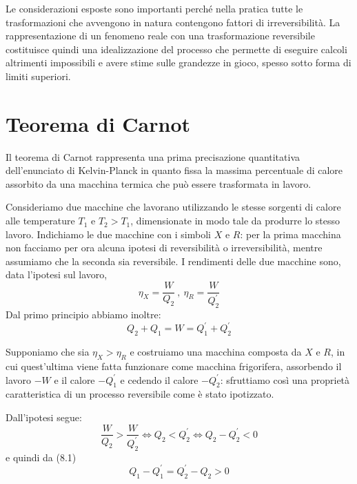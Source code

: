 \documentclass[class=book, crop=false, oneside, 12pt]{standalone}
\begin{document}
Le considerazioni esposte sono importanti perché nella pratica tutte le trasformazioni che avvengono in natura contengono fattori di irreversibilità.  
La rappresentazione di un fenomeno reale con una trasformazione reversibile costituisce quindi una idealizzazione del processo che permette di eseguire calcoli altrimenti impossibili e avere stime sulle grandezze in gioco, spesso sotto forma di limiti superiori.

\section{Teorema di Carnot}

Il teorema di Carnot rappresenta una prima precisazione quantitativa dell'enunciato di Kelvin-Planck in quanto fissa la massima percentuale di calore assorbito da una macchina termica che può essere trasformata in lavoro.

Consideriamo due macchine che lavorano utilizzando le stesse sorgenti di calore alle temperature \(T_1\) e \(T_2>T_1\), dimensionate in modo tale da produrre lo stesso lavoro. 
Indichiamo le due macchine con i simboli \(X\) e \(R\): per la prima macchina non facciamo per ora alcuna ipotesi di reversibilità o irreversibilità, mentre assumiamo che la seconda sia reversibile. 
I rendimenti delle due macchine sono, data l'ipotesi sul lavoro,
\begin{equation*}
    \eta_X = \frac{W}{Q_2} \ , \ \eta_R = \frac{W}{Q^{\prime}_2}
\end{equation*}
Dal primo principio abbiamo inoltre:
\begin{equation}
    Q_2 + Q_1 = W = Q_1^{\prime} + Q_2^{\prime}
\end{equation}

Supponiamo che sia \(\eta_X > \eta_R\) e costruiamo una macchina composta da \(X\) e \(R\), in cui quest'ultima viene fatta funzionare come macchina frigorifera, assorbendo il lavoro \(-W\) e il calore \(-Q^{\prime}_1\) e cedendo il calore \(-Q_2^{\prime}\):
sfruttiamo così una proprietà caratteristica di un processo reversibile come è stato ipotizzato.

Dall'ipotesi segue:
\begin{equation*}
    \frac{W}{Q_2} > \frac{W}{Q_2^{\prime}} \Leftrightarrow Q_2 < Q_2^{\prime} \Leftrightarrow Q_2 - Q_2^{\prime} < 0
\end{equation*}
e quindi da (8.1)
\begin{equation*}
    Q_1 - Q_1^{\prime} = Q_2^{\prime} - Q_2 > 0 
\end{equation*}
\end{document}
